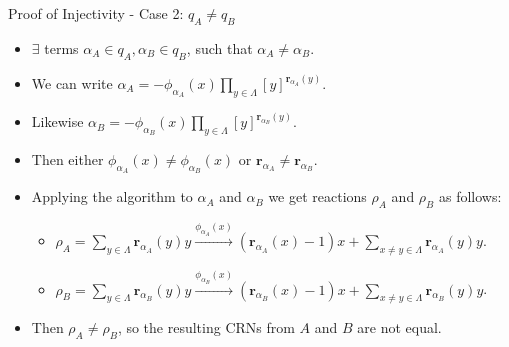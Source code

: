 \begin{frame}{Proof of Injectivity - Case 2: $q_{A} \neq q_{B}$}
\begin{itemize}
\item $\exists$ terms $\alpha_{A} \in q_{A}, \alpha_{B} \in q_{B}$, such that $\alpha_{A} \neq \alpha_{B}$.
\item We can write $\alpha_{A} = - \phi_{\alpha_{A}}(x) \prod\limits_{y \in \Lambda} \left[ y \right]^{\textbf{r}_{\alpha_{A}}(y)}$.
\item Likewise $\alpha_{B} = - \phi_{\alpha_{B}}(x) \prod\limits_{y \in \Lambda} \left[ y \right]^{\textbf{r}_{\alpha_{B}}(y)}$.
\item Then either $\phi_{\alpha_{A}}(x) \neq \phi_{\alpha_{B}}(x)$ or $\textbf{r}_{\alpha_{A}} \neq \textbf{r}_{\alpha_{B}}$.
\item Applying the algorithm to $\alpha_{A}$ and $\alpha_{B}$ we get reactions $\rho_{A}$ and $\rho_{B}$ as follows:
	\begin{itemize}
	\item $\rho_{A} = \sum\limits_{y \in \Lambda} \textbf{r}_{\alpha_{A}}(y) y \xrightarrow{\phi_{\alpha_{A}}(x)}
		  (\textbf{r}_{\alpha_{A}}(x) - 1) x + \sum\limits_{x \neq y \in \Lambda} \textbf{r}_{\alpha_{A}}(y) y$.
    \item $\rho_{B} = \sum\limits_{y \in \Lambda} \textbf{r}_{\alpha_{B}}(y) y \xrightarrow{\phi_{\alpha_{B}}(x)}
		  (\textbf{r}_{\alpha_{B}}(x) - 1) x + \sum\limits_{x \neq y \in \Lambda} \textbf{r}_{\alpha_{B}}(y) y$.
	\end{itemize}
\item Then $\rho_{A} \neq \rho_{B}$, so the resulting CRNs from $A$ and $B$ are not equal.
\end{itemize}
\end{frame}
